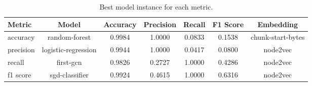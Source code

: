 \begin{table}
    \centering
    \caption{Best model instance for each metric.}
    \begin{tabular}{|l|c|c|c|c|c|c|} \hline 
      \textbf{Metric} & \textbf{Model}  & \textbf{Accuracy} & \textbf{Precision} & \textbf{Recall} & \textbf{F1 Score} & \textbf{Embedding}  \\ \hline 
        accuracy & random-forest & 0.9984 & 1.0000 & 0.0833 & 0.1538 & chunk-start-bytes \\ \hline 
        precision & logistic-regression & 0.9944 & 1.0000 & 0.0417 & 0.0800 & node2vec \\ \hline 
        recall & first-gcn & 0.9826 & 0.2727 & 1.0000 & 0.4286 & node2vec \\ \hline 
        f1 score & sgd-classifier & 0.9924 & 0.4615 & 1.0000 & 0.6316 & node2vec \\ \hline 
    \end{tabular}
\end{table}

